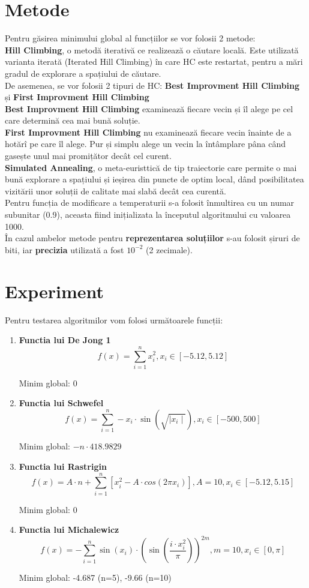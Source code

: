 \documentclass{article}
\begin{document}
\section{Metode}
Pentru găsirea minimului global al funcțiilor se vor folosii 2 metode:\\
\textbf{Hill Climbing}, o metodă iterativă ce realizează o căutare locală. Este utilizată varianta iterată (Iterated Hill Climbing) în care HC este restartat, pentru a mări gradul de explorare a spațiului de căutare.\\
De asemenea, se vor folosii 2 tipuri de HC:  \textbf{Best Improvment Hill Climbing} și \textbf{First Improvment Hill Climbing}\\
\textbf{Best Improvment Hill Climbing} examinează fiecare vecin și îl alege pe cel care determină cea mai bună soluție.\\
\textbf{First Improvment Hill Climbing} nu examinează fiecare vecin înainte de a hotărî pe care îl alege. Pur și simplu alege un vecin la întâmplare pâna când gasește unul mai promițător decât cel curent.\\
\textbf{Simulated Annealing}, o meta-euristtică de tip traiectorie care permite o mai bună explorare a spațiului 
și ieșirea din puncte de optim local, dând posibilitatea vizitării unor soluții de calitate mai slabă decât cea curentă. \\
Pentru funcția de modificare a temperaturii s-a folosit înmultirea cu un numar subunitar (0.9), aceasta fiind inițializata la începutul algoritmului cu valoarea 1000.\\
În cazul ambelor metode pentru \textbf{reprezentarea soluțiilor} s-au folosit șiruri de biti, iar \textbf{precizia} utilizată a fost $10^{-2}$ (2 zecimale).

\section{Experiment}
Pentru testarea algoritmilor vom folosi următoarele funcții:
\begin{enumerate}
\item \textbf{Functia lui De Jong 1}
$$ f(x) = \sum_{i=1}^n x_i^2, 
x_i \in \left[ -5.12, 5.12 \right]$$

Minim global: 0

\item \textbf{Functia lui Schwefel}
$$ f(x) = \sum_{i=1}^n -x_i \cdot \sin (\sqrt{\mid x_i\mid}),
x_i \in \left[ -500, 500\right]  $$

Minim global: $-n \cdot 418.9829$
\item \textbf{Functia lui Rastrigin}
$$ f(x) = A \cdot n + \sum_{i=1}^n \left[ x_i^2 - A \cdot cos(2 \pi x_i) \right],
A = 10, x_i \in \left[ -5.12, 5.15 \right]$$

Minim global: 0
\item \textbf{Functia lui Michalewicz}
$$ f(x) = -\sum_{i=1}^n \sin (x_i) \cdot \left( \sin \left( \frac{i \cdot x_i^{2}}{\pi} \right) \right)  ^{2m},
m = 10, x_i \in \left[ 0, \pi \right] $$

Minim global: -4.687 (n=5), -9.66 (n=10)
\end{enumerate}
\end{document}
